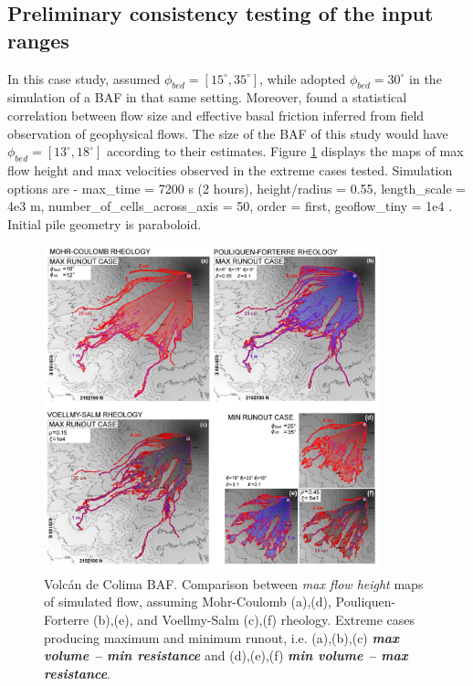 \documentclass{article}
\begin{document}
\subsection{Preliminary consistency testing of the input ranges}
In this case study, \cite{Dalbey2008} assumed $\phi_{bed}=[15^\mathrm{\circ}, 35^\mathrm{\circ}]$, while \citep{Capra2011} adopted $\phi_{bed}=30^\mathrm{\circ}$ in the simulation of a BAF in that same setting. Moreover, \cite{Spiller2014,Bayarri2015,Ogburn2016} found a statistical correlation between flow size and effective basal friction inferred from field observation of geophysical flows. The size of the BAF of this study would have $\phi_{bed}=[13^\mathrm{\circ}, 18^\mathrm{\circ}]$ according to their estimates. Figure \ref{Colima-MaxMinExtents} displays the maps of max flow height and max velocities observed in the extreme cases tested. Simulation options are - max\_time = 7200 s (2 hours), height/radius = 0.55, length\_scale = 4e3 m, number\_of\_cells\_across\_axis = 50, order = first, geoflow\_tiny = 1e4 \citep{Patra2005,Aghakhani2016}. Initial pile geometry is paraboloid.

\begin{figure}[H]
         \centering
        \includegraphics[width=0.87\textwidth]{Figures/ExtremeMaps.jpg}
        \caption{Volc\'an de Colima BAF. Comparison between \emph{max flow height} maps of simulated flow, assuming Mohr-Coulomb (a),(d), Pouliquen-Forterre (b),(e), and Voellmy-Salm (c),(f) rheology. Extreme cases producing maximum and minimum runout, i.e. (a),(b),(c) \emph{\textbf{max volume -- min resistance}} and (d),(e),(f) \emph{\textbf{min volume -- max resistance}}.}
        \label{Colima-MaxMinExtents}
\end{figure}
\end{document}
